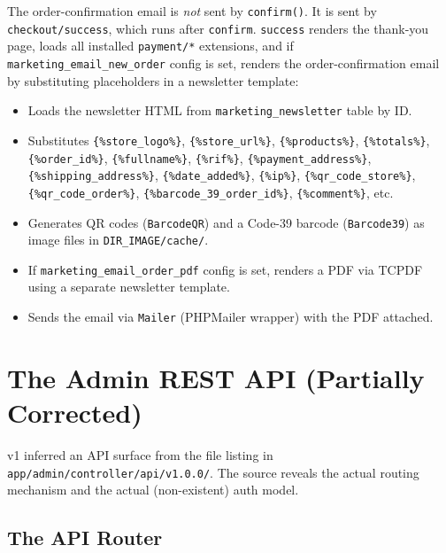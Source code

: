 \documentclass[11pt,a4paper]{article}
\begin{document}
The order-confirmation email is \emph{not} sent by \texttt{confirm()}.
It is sent by \texttt{checkout/success}, which runs after
\texttt{confirm}. \texttt{success} renders the thank-you page, loads
all installed \texttt{payment/*} extensions, and if
\texttt{marketing\_email\_new\_order} config is set, renders the
order-confirmation email by substituting placeholders in a
newsletter template:

\begin{itemize}[leftmargin=1.6em,itemsep=2pt]
  \item Loads the newsletter HTML from \texttt{marketing\_newsletter}
        table by ID.
  \item Substitutes \texttt{\{\%store\_logo\%\}},
        \texttt{\{\%store\_url\%\}}, \texttt{\{\%products\%\}},
        \texttt{\{\%totals\%\}}, \texttt{\{\%order\_id\%\}},
        \texttt{\{\%fullname\%\}}, \texttt{\{\%rif\%\}},
        \texttt{\{\%payment\_address\%\}},
        \texttt{\{\%shipping\_address\%\}},
        \texttt{\{\%date\_added\%\}}, \texttt{\{\%ip\%\}},
        \texttt{\{\%qr\_code\_store\%\}},
        \texttt{\{\%qr\_code\_order\%\}},
        \texttt{\{\%barcode\_39\_order\_id\%\}},
        \texttt{\{\%comment\%\}}, etc.
  \item Generates QR codes (\texttt{BarcodeQR}) and a Code-39 barcode
        (\texttt{Barcode39}) as image files in
        \texttt{DIR\_IMAGE/cache/}.
  \item If \texttt{marketing\_email\_order\_pdf} config is set,
        renders a PDF via TCPDF using a separate newsletter template.
  \item Sends the email via \texttt{Mailer} (PHPMailer wrapper) with
        the PDF attached.
\end{itemize}

\section{The Admin REST API (Partially Corrected)}\label{sec:api}

v1 inferred an API surface from the file listing in
\texttt{app/admin/controller/api/v1.0.0/}. The source reveals the
actual routing mechanism and the actual (non-existent) auth model.

\subsection{The API Router}
\end{document}
